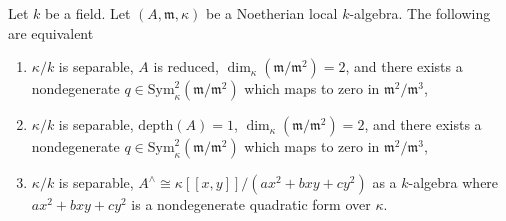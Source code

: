 \begin{lemma}
\label{lemma-nodal-algebraic}
Let $k$ be a field. Let $(A, \mathfrak m, \kappa)$ be a Noetherian
local $k$-algebra. The following are equivalent
\begin{enumerate}
\item $\kappa/k$ is separable, $A$ is reduced,
$\dim_\kappa(\mathfrak m/\mathfrak m^2) = 2$, and there exists a nondegenerate
$q \in \text{Sym}^2_\kappa(\mathfrak m/\mathfrak m^2)$
which maps to zero in $\mathfrak m^2/\mathfrak m^3$,
\item $\kappa/k$ is separable, $\text{depth}(A) = 1$,
$\dim_\kappa(\mathfrak m/\mathfrak m^2) = 2$, and there exists a nondegenerate
$q \in \text{Sym}^2_\kappa(\mathfrak m/\mathfrak m^2)$
which maps to zero in $\mathfrak m^2/\mathfrak m^3$,
\item $\kappa/k$ is separable,
$A^\wedge \cong \kappa[[x, y]]/(ax^2 + bxy + cy^2)$
as a $k$-algebra where $ax^2 + bxy + cy^2$ is a nondegenerate quadratic form
over $\kappa$.
\end{enumerate}
\end{lemma}

